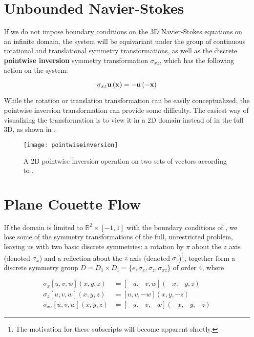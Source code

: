 \section{Unbounded Navier-Stokes}

If we do not impose boundary conditions on the 3D Navier-Stokes equations on an infinite domain, the system will be equivariant under the group of continuous rotational and translational symmetry transformations, as well as the discrete {\bf pointwise inversion} symmetry transformation $\sigma_{xz}$, which has the following action on the system:

\begin{equation}\label{eq:pointwiseinversion}
\sigma_{xz}\mathbf{u}\left ( \mathbf{x} \right ) = -\mathbf{u}\left ( -\mathbf{x} \right )
\end{equation}

While the rotation or translation transformation can be easily conceptualized, the pointwise inversion transformation can provide some difficulty. The easiest way of visualizing the transformation is to view it in a 2D domain instead of in the full 3D, as shown in . 

\begin{figure}[h]
\texttt{[image: pointwiseinversion]}
\caption{A 2D pointwise inversion operation on two sets of vectors according to .}\label{fig:pointwiseinversion}

\end{figure}


\section{Plane Couette Flow}

If the domain is limited to $\mathbb{R}^2 \times [-1,1]$ with the boundary conditions of \pCf, we lose some of the symmetry transformations of the full, unrestricted problem, leaving us with two basic discrete symmetries: a rotation by $\pi$ about the $z$ axis (denoted $\sigma_x$) and a reflection about the $z$ axis (denoted $\sigma_z$)\footnote{The motivation for these subscripts will become apparent shortly.}, together form a discrete symmetry group $D = D_1 \times D_1 = \{e, \sigma_x,\sigma_z,\sigma_{xz}\}$ of order 4, where

\begin{align}\label{eq:discretesymm}
\sigma_x [u,v,w](x,y,z) &= [-u,-v,w](-x,-y,z)\\
\sigma_z [u,v,w](x,y,z) &= [u,v,-w](x,y,-z)\\
\sigma_{xz} [u,v,w](x,y,z) &= [-u,-v,-w](-x,-y,-z)
\end{align}

